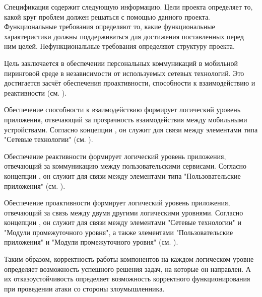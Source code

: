 %
Спецификация \PeerHood содержит следующую информацию.
%
Цели проекта определяет то, какой круг проблем должен решаться с помощью данного проекта. 
%
Функциональные требования определяют то, какие функциональные характеристики должны поддерживаться \PeerHood для достижения поставленных перед ним целей. 
%
Нефункциональные требования определяют структуру проекта. 



%
Цель \PeerHood заключается в обеспечении персональных коммуникаций в мобильной пиринговой среде в независимости от используемых сетевых технологий. 
%
Это достигается засчёт обеспечения проактивности, способности к взаимодействию и реактивности (см. ).

%
Обеспечение способности к взаимодействию формирует логический уровень приложения, отвечающий за прозрачность взаимодействия между мобильными устройствами.
%
Согласно концепции \PeerHood, он служит для связи между элементами типа "Сетевые технологии" (см. ). 

%
Обеспечение реактивности формирует логический уровень приложения, отвечающий за коммуникацию между пользовательскими сервисами. 
%
Согласно концепции \PeerHood, он служит для связи между элементами типа "Пользовательские приложения" (см. ). 

%
Обеспечение проактивности формирует логический уровень приложения, отвечающий за связь между двумя другими логическими уровнями. 
%
Согласно концепции \PeerHood, он служит для связи между элементами "Сетевые технологии" и "Модули промежуточного уровня", а также элементами "Пользовательские приложения" и "Модули промежуточного уровня" (см. ). 

%
Таким образом, корректность работы компонентов \PeerHood на каждом логическом уровне определяет возможность успешного решения задач, на которые он направлен. 
%
А их отказоустойчивость определяет возможность корректного функционирования \PeerHood при проведении атаки со стороны злоумышленника.

